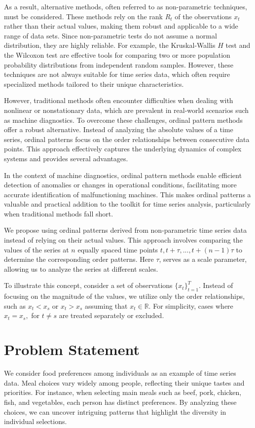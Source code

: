 As a result, alternative methods, often referred to as non-parametric techniques, must be considered. These methods rely on the rank $R_t$ of the observations $x_t$ rather than their actual values, making them robust and applicable to a wide range of data sets. Since non-parametric tests do not assume a normal distribution, they are highly reliable. For example, the Kruskal-Wallis $H$ test and the Wilcoxon test are effective tools for comparing two or more population probability distributions from independent random samples. However, these techniques are not always suitable for time series data, which often require specialized methods tailored to their unique characteristics.

However, traditional methods often encounter difficulties when dealing with nonlinear or nonstationary data, which are prevalent in real-world scenarios such as machine diagnostics. To overcome these challenges, ordinal pattern methods offer a robust alternative. Instead of analyzing the absolute values of a time series, ordinal patterns focus on the order relationships between consecutive data points. This approach effectively captures the underlying dynamics of complex systems and provides several advantages. 

In the context of machine diagnostics, ordinal pattern methods enable efficient detection of anomalies or changes in operational conditions, facilitating more accurate identification of malfunctioning machines. This makes ordinal patterns a valuable and practical addition to the toolkit for time series analysis, particularly when traditional methods fall short.

We propose using ordinal patterns derived from non-parametric time series data instead of relying on their actual values. This approach involves comparing the values of the series at $n$ equally spaced time points $t, t+\tau, ..., t+(n-1)\tau$ to determine the corresponding order patterns. Here $\tau$, serves as a scale parameter, allowing us to analyze the series at different scales.
 
To illustrate this concept, consider a set of observations $\{x_t\}^T_{t=1}$. Instead of focusing on the magnitude of the values, we utilize only the order relationships, such as $x_t< x_s$ or $x_t >x_s$ assuming that $x_t \in \mathbb{R}$. For simplicity, cases where  $x_t =x_s,$ for $t\neq s$ are treated separately or excluded.   

\section*{Problem Statement}
We consider food preferences among individuals as an example of time series data. Meal choices vary widely among people, reflecting their unique tastes and priorities. For instance, when selecting main meals such as beef, pork, chicken, fish, and vegetables, each person has distinct preferences. By analyzing these choices, we can uncover intriguing patterns that highlight the diversity in individual selections.

